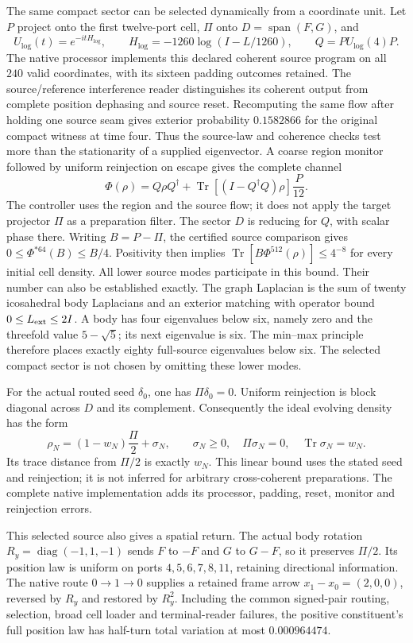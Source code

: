 The same compact sector can be selected dynamically from a coordinate
unit. Let $P$ project onto the first twelve-port cell,
$\Pi$ onto $D=\operatorname{span}(F,G)$, and
\[
 U_{\log}(t)=e^{-itH_{\log}},\qquad
 H_{\log}=-1260\log(I-L/1260),\qquad Q=PU_{\log}(4)P.
\]
The native processor implements this declared coherent source program
on all $240$ valid coordinates, with its sixteen padding outcomes retained.
The source/reference interference reader distinguishes its coherent output
from complete position dephasing and source reset. Recomputing the same
flow after holding one source seam gives exterior probability $0.1582866$
for the original compact witness at time four. Thus the source-law and
coherence checks test more than the stationarity of a supplied eigenvector.
A coarse region monitor followed by uniform reinjection on escape gives
the complete channel
\[
 \Phi(\rho)=Q\rho Q^\dagger+
 \operatorname{Tr}\!\left[(I-Q^\dagger Q)\rho\right]\frac{P}{12}.
\]
The controller uses the region and the source flow; it does not apply
the target projector $\Pi$ as a preparation filter. The sector $D$ is
reducing for $Q$, with scalar phase there. Writing $B=P-\Pi$, the
certified source comparison gives
$0\leq\Phi^{*64}(B)\leq B/4$.
Positivity then implies
$\operatorname{Tr}[B\Phi^{512}(\rho)]\leq4^{-8}$ for every initial
cell density. All lower source modes participate in this bound.
Their number can also be established exactly. The graph Laplacian is the
sum of twenty icosahedral body Laplacians and an exterior matching with
operator bound $0\leq L_{\rm ext}\leq2I$. A body has four eigenvalues
below six, namely zero and the threefold value $5-\sqrt5$; its next
eigenvalue is six. The min--max principle therefore places exactly
eighty full-source eigenvalues below six. The selected compact sector
is not chosen by omitting these lower modes.

For the actual routed seed $\delta_0$, one has $\Pi\delta_0=0$.
Uniform reinjection is block diagonal across $D$ and its complement.
Consequently the ideal evolving density has the form
\[
 \rho_N=(1-w_N)\frac{\Pi}{2}+\sigma_N,
 \qquad \sigma_N\geq0,\quad \Pi\sigma_N=0,
 \quad \operatorname{Tr}\sigma_N=w_N.
\]
Its trace distance from $\Pi/2$ is exactly $w_N$. This linear bound
uses the stated seed and reinjection; it is not inferred for arbitrary
cross-coherent preparations. The complete native implementation adds
its processor, padding, reset, monitor and reinjection errors.

This selected source also gives a spatial return. The actual body
rotation $R_y=\operatorname{diag}(-1,1,-1)$ sends $F$ to $-F$ and
$G$ to $G-F$, so it preserves $\Pi/2$. Its position law is uniform
on ports $4,5,6,7,8,11$, retaining directional information.
The native route $0\to1\to0$ supplies a retained frame arrow
$x_1-x_0=(2,0,0)$, reversed by $R_y$ and restored by $R_y^2$.
Including the common signed-pair routing, selection, broad cell loader
and terminal-reader failures, the positive constituent's full position
law has half-turn total variation at most $0.000964474$.

